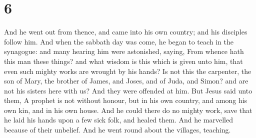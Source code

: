 \hypertarget{section-5}{%
\section{6}\label{section-5}}

 And he went out from thence, and came into his own
country; and his disciples follow him.  And when the
sabbath day was come, he began to teach in the synagogue: and many
hearing him were astonished, saying, From whence hath this man these
things? and what wisdom is this which is given unto him, that even such
mighty works are wrought by his hands?  Is not this the
carpenter, the son of Mary, the brother of James, and Joses, and of
Juda, and Simon? and are not his sisters here with us? And they were
offended at him.  But Jesus said unto them, A prophet is
not without honour, but in his own country, and among his own kin, and
in his own house.  And he could there do no mighty work,
save that he laid his hands upon a few sick folk, and healed them.
 And he marvelled because of their unbelief. And he went
round about the villages, teaching.

